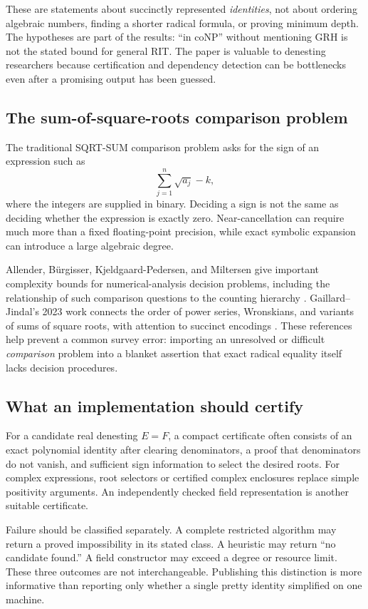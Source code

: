 \documentclass[11pt,letterpaper]{article}
\numberwithin{equation}{section}
\theoremstyle{definition}
\theoremstyle{remark}
\begin{document}
These are statements about succinctly represented \emph{identities}, not about ordering algebraic numbers, finding a shorter radical formula, or proving minimum depth. The hypotheses are part of the results: ``in coNP'' without mentioning GRH is not the stated bound for general RIT. The paper is valuable to denesting researchers because certification and dependency detection can be bottlenecks even after a promising output has been guessed.

\subsection{The sum-of-square-roots comparison problem}
The traditional SQRT-SUM comparison problem asks for the sign of an expression such as
\[
\sum_{j=1}^n\sqrt{a_j}-k,
\]
where the integers are supplied in binary. Deciding a sign is not the same as deciding whether the expression is exactly zero. Near-cancellation can require much more than a fixed floating-point precision, while exact symbolic expansion can introduce a large algebraic degree.

Allender, B\"urgisser, Kjeldgaard-Pedersen, and Miltersen give important complexity bounds for numerical-analysis decision problems, including the relationship of such comparison questions to the counting hierarchy \cite{allender}. Gaillard--Jindal's 2023 work connects the order of power series, Wronskians, and variants of sums of square roots, with attention to succinct encodings \cite{gaillard}. These references help prevent a common survey error: importing an unresolved or difficult \emph{comparison} problem into a blanket assertion that exact radical equality itself lacks decision procedures.

\subsection{What an implementation should certify}
For a candidate real denesting $E=F$, a compact certificate often consists of an exact polynomial identity after clearing denominators, a proof that denominators do not vanish, and sufficient sign information to select the desired roots. For complex expressions, root selectors or certified complex enclosures replace simple positivity arguments. An independently checked field representation is another suitable certificate.

Failure should be classified separately. A complete restricted algorithm may return a proved impossibility in its stated class. A heuristic may return ``no candidate found.'' A field constructor may exceed a degree or resource limit. These three outcomes are not interchangeable. Publishing this distinction is more informative than reporting only whether a single pretty identity simplified on one machine.
\end{document}
